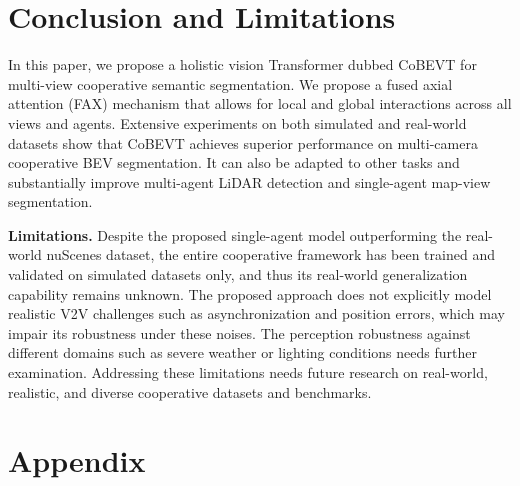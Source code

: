 \documentclass{article}
\begin{document}
{\section{Conclusion and Limitations}
\label{sec:conclusion}
In this paper, we propose a holistic vision Transformer dubbed CoBEVT for multi-view cooperative semantic segmentation.
%
We propose a fused axial attention (FAX) mechanism that allows for local and global interactions across all views and agents.
%
Extensive experiments on both simulated and real-world datasets show that CoBEVT achieves superior performance on multi-camera cooperative BEV segmentation. It can also be adapted to other tasks and substantially improve multi-agent LiDAR detection and single-agent map-view segmentation.

\textbf{Limitations.}
%
Despite the proposed single-agent model outperforming the real-world nuScenes dataset, the entire cooperative framework has been trained and validated on simulated datasets only, and thus its real-world generalization capability remains unknown. 
%
The proposed approach does not explicitly model realistic V2V challenges such as asynchronization and position errors, which may impair its robustness under these noises.
%
The perception robustness against different domains such as severe weather or lighting conditions needs further examination.
%
Addressing these limitations needs future research on real-world, realistic, and diverse cooperative datasets and benchmarks.








\clearpage

\appendix
\section*{Appendix}

}
\end{document}
